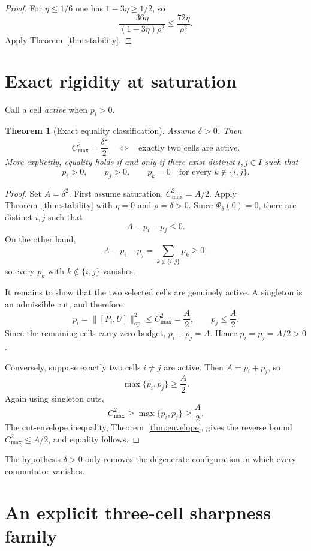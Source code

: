 \documentclass[11pt]{article}
\newtheorem{theorem}{Theorem}[section]
\newcommand{\op}{\mathrm{op}}
\newcommand{\cmax}{C_{\max}}
\newcommand{\dd}{\delta}
\newcommand{\etaq}{\eta}
\begin{document}
\begin{proof}
For $\etaq\le1/6$ one has
$1-3\etaq\ge1/2$, so
\[
  \frac{36\etaq}{(1-3\etaq)\rho^2}
  \le
  \frac{72\etaq}{\rho^2}.
\]
Apply Theorem~\ref{thm:stability}.
\end{proof}


\section{Exact rigidity at saturation}

Call a cell \emph{active} when $p_i>0$.

\begin{theorem}[Exact equality classification]\label{thm:rigidity}
Assume $\dd>0$.  Then
\[
  \boxed{
    \cmax^2=\frac{\dd^2}{2}
    \quad\Longleftrightarrow\quad
    \text{exactly two cells are active}.
  }
\]
More explicitly, equality holds if and only if there exist distinct
$i,j\in I$ such that
\[
  p_i>0,\qquad p_j>0,\qquad
  p_k=0\quad\text{for every }k\notin\{i,j\}.
\]
\end{theorem}

\begin{proof}
Set $A=\dd^2$.  First assume saturation,
$\cmax^2=A/2$.  Apply Theorem~\ref{thm:stability} with
$\etaq=0$ and $\rho=\dd>0$.  Since $\Phi_{\dd}(0)=0$, there are distinct
$i,j$ such that
\[
  A-p_i-p_j\le0.
\]
On the other hand,
\[
  A-p_i-p_j=\sum_{k\notin\{i,j\}}p_k\ge0,
\]
so every $p_k$ with $k\notin\{i,j\}$ vanishes.

It remains to show that the two selected cells are genuinely active.  A
singleton is an admissible cut, and therefore
\[
  p_i=\|[P_i,U]\|_{\op}^2\le\cmax^2=\frac A2,
  \qquad
  p_j\le\frac A2.
\]
Since the remaining cells carry zero budget, $p_i+p_j=A$.  Hence
$p_i=p_j=A/2>0$.

Conversely, suppose exactly two cells $i\ne j$ are active.  Then
$A=p_i+p_j$, so
\[
  \max\{p_i,p_j\}\ge\frac A2.
\]
Again using singleton cuts,
\[
  \cmax^2\ge\max\{p_i,p_j\}\ge\frac A2.
\]
The cut-envelope inequality, Theorem~\ref{thm:envelope}, gives the reverse
bound $\cmax^2\le A/2$, and equality follows.
\end{proof}

The hypothesis $\dd>0$ only removes the degenerate configuration in which
every commutator vanishes.


\section{An explicit three-cell sharpness family}\label{sec:sharp}
\end{document}
